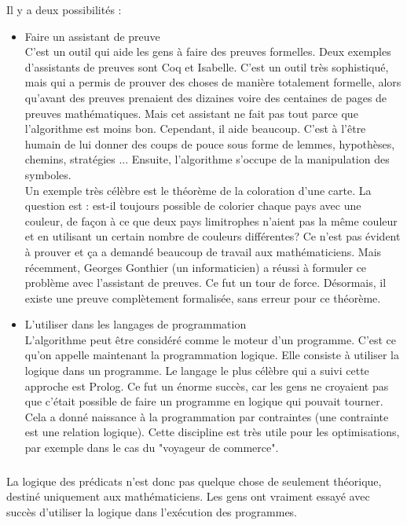 Il y a deux possibilités : 
\begin{itemize}
\item Faire un assistant de preuve\\
C'est un outil qui aide les gens à faire des preuves formelles. Deux exemples d'assistants de preuves sont Coq et Isabelle. C'est un outil très sophistiqué, mais qui a permis de prouver des choses de manière totalement formelle, alors qu'avant des preuves prenaient des dizaines voire des centaines de pages de preuves mathématiques. Mais cet assistant ne fait pas tout parce que l'algorithme est moins bon. Cependant, il aide beaucoup. C'est à l'être humain de lui donner des coups de pouce sous forme de lemmes, hypothèses, chemins, stratégies ... Ensuite, l'algorithme s'occupe de la manipulation des symboles.\\
Un exemple très célèbre est le théorème de la coloration d'une carte. La question est : est-il toujours possible de colorier chaque pays avec une couleur, de façon à ce que deux pays limitrophes n'aient pas la même couleur et en utilisant un certain nombre de couleurs différentes? Ce n'est pas évident à prouver et ça a demandé beaucoup de travail aux mathématiciens. Mais récemment, Georges Gonthier (un informaticien) a réussi à formuler ce problème avec l'assistant de preuves. Ce fut un tour de force. Désormais, il existe une preuve complètement formalisée, sans erreur pour ce théorème.
\item L'utiliser dans les langages de programmation\\ 
L'algorithme peut être considéré comme le moteur d'un programme. C'est ce qu'on appelle maintenant la programmation logique. Elle consiste à utiliser la logique dans un programme. Le langage le plus célèbre qui a suivi cette approche est Prolog. Ce fut un énorme succès, car les gens ne croyaient pas que c'était possible de faire un programme en logique qui pouvait tourner. Cela a donné naissance à la programmation par contraintes (une contrainte est une relation logique). Cette discipline est très utile pour les optimisations, par exemple dans le cas du "voyageur de commerce".
\end{itemize}
\subsubsection{}
La logique des prédicats n'est donc pas quelque chose de seulement théorique, destiné uniquement aux mathématiciens. Les gens ont vraiment essayé avec succès d'utiliser la logique dans l'exécution des programmes.
